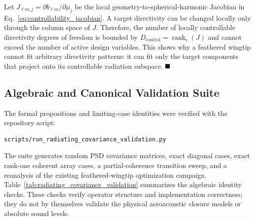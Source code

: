 \documentclass[11pt]{article}
\begin{document}
Let $J_{\ell m,j}=\partial b_{\ell m}/\partial\mu_j$ be the local geometry-to-spherical-harmonic Jacobian in Eq.~\ref{eq:controllability_jacobian}. A target directivity can be changed locally only through the column space of $J$. Therefore, the number of locally controllable directivity degrees of freedom is bounded by $D_{\mathrm{control}}=\operatorname{rank}_\epsilon(J)$ and cannot exceed the number of active design variables. This shows why a feathered wingtip cannot fit arbitrary directivity patterns: it can fit only the target components that project onto its controllable radiation subspace. $\hfill \blacksquare$

\subsection{Algebraic and Canonical Validation Suite}

The formal propositions and limiting-case identities were verified with the repository script:
\begin{verbatim}
scripts/run_radiating_covariance_validation.py
\end{verbatim}
The suite generates random PSD covariance matrices, exact diagonal cases, exact rank-one coherent array cases, a partial-coherence transition sweep, and a reanalysis of the existing feathered-wingtip optimization campaign. Table~\ref{tab:radiating_covariance_validation} summarizes the algebraic identity checks. These checks verify operator structure and implementation correctness; they do not by themselves validate the physical aeroacoustic closure models or absolute sound levels.
\end{document}
